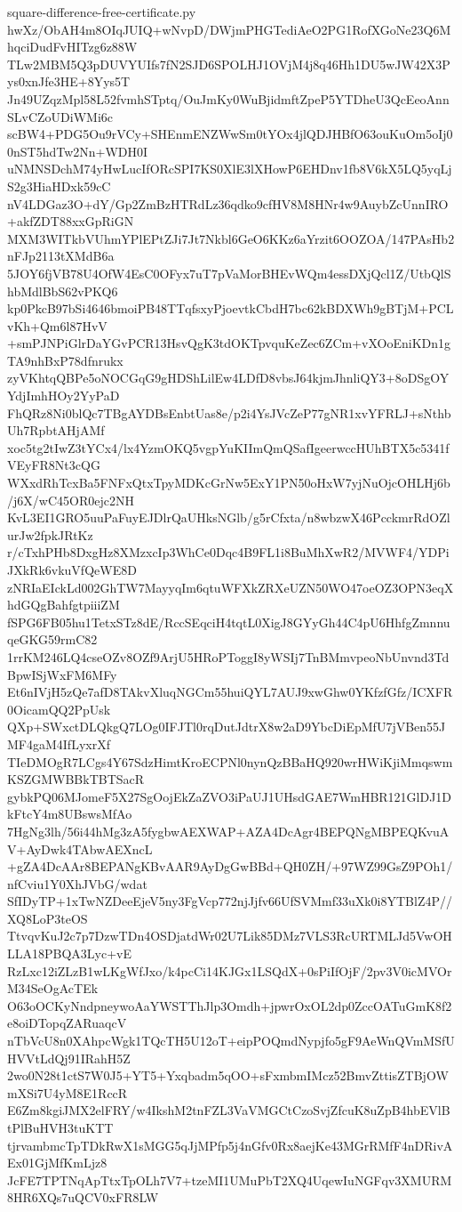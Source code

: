\documentclass[11pt]{article}
\theoremstyle{definition}
\theoremstyle{remark}
\begin{document}
\begin{filecontents*}[overwrite]{square-difference-free-certificate.py}
hwXz/ObAH4m8OIqJUIQ+wNvpD/DWjmPHGTediAeO2PG1RofXGoNe23Q6MhqciDudFvHITzg6z88W
TLw2MBM5Q3pDUVYUIfs7fN2SJD6SPOLHJ1OVjM4j8q46Hh1DU5wJW42X3Pys0xnJfe3HE+8Yys5T
Jn49UZqzMpl58L52fvmhSTptq/OuJmKy0WuBjidmftZpeP5YTDheU3QcEeoAnnSLvCZoUDiWMi6c
scBW4+PDG5Ou9rVCy+SHEnmENZWwSm0tYOx4jlQDJHBfO63ouKuOm5oIj00nST5hdTw2Nn+WDH0I
uNMNSDchM74yHwLucIfORcSPI7KS0XlE3lXHowP6EHDnv1fb8V6kX5LQ5yqLjS2g3HiaHDxk59cC
nV4LDGaz3O+dY/Gp2ZmBzHTRdLz36qdko9cfHV8M8HNr4w9AuybZcUnnIRO+akfZDT88xxGpRiGN
MXM3WITkbVUhmYPlEPtZJi7Jt7Nkbl6GeO6KKz6aYrzit6OOZOA/147PAsHb2nFJp2113tXMdB6a
5JOY6fjVB78U4OfW4EsC0OFyx7uT7pVaMorBHEvWQm4essDXjQcl1Z/UtbQlShbMdlBbS62vPKQ6
kp0PkcB97bSi4646bmoiPB48TTqfsxyPjoevtkCbdH7bc62kBDXWh9gBTjM+PCLvKh+Qm6l87HvV
+smPJNPiGlrDaYGvPCR13HsvQgK3tdOKTpvquKeZec6ZCm+vXOoEniKDn1gTA9nhBxP78dfnrukx
zyVKhtqQBPe5oNOCGqG9gHDShLilEw4LDfD8vbsJ64kjmJhnliQY3+8oDSgOYYdjImhHOy2YyPaD
FhQRz8Ni0blQc7TBgAYDBsEnbtUas8e/p2i4YsJVcZeP77gNR1xvYFRLJ+sNthbUh7RpbtAHjAMf
xoc5tg2tIwZ3tYCx4/lx4YzmOKQ5vgpYuKIImQmQSafIgeerwccHUhBTX5c5341fVEyFR8Nt3cQG
WXxdRhTcxBa5FNFxQtxTpyMDKcGrNw5ExY1PN50oHxW7yjNuOjcOHLHj6b/j6X/wC45OR0ejc2NH
KvL3EI1GRO5uuPaFuyEJDlrQaUHksNGlb/g5rCfxta/n8wbzwX46PcckmrRdOZlurJw2fpkJRtKz
r/cTxhPHb8DxgHz8XMzxcIp3WhCe0Dqc4B9FL1i8BuMhXwR2/MVWF4/YDPiJXkRk6vkuVfQeWE8D
zNRIaEIckLd002GhTW7MayyqIm6qtuWFXkZRXeUZN50WO47oeOZ3OPN3eqXhdGQgBahfgtpiiiZM
fSPG6FB05hu1TetxSTz8dE/RccSEqciH4tqtL0XigJ8GYyGh44C4pU6HhfgZmnnuqeGKG59rmC82
1rrKM246LQ4cseOZv8OZf9ArjU5HRoPToggI8yWSIj7TnBMmvpeoNbUnvnd3TdBpwISjWxFM6MFy
Et6nIVjH5zQe7afD8TAkvXluqNGCm55huiQYL7AUJ9xwGhw0YKfzfGfz/ICXFR0OicamQQ2PpUsk
QXp+SWxctDLQkgQ7LOg0IFJTl0rqDutJdtrX8w2aD9YbcDiEpMfU7jVBen55JMF4gaM4IfLyxrXf
TIeDMOgR7LCgs4Y67SdzHimtKroECPNl0nynQzBBaHQ920wrHWiKjiMmqswmKSZGMWBBkTBTSacR
gybkPQ06MJomeF5X27SgOojEkZaZVO3iPaUJ1UHsdGAE7WmHBR121GlDJ1DkFtcY4m8UBswsMfAo
7HgNg3lh/56i44hMg3zA5fygbwAEXWAP+AZA4DcAgr4BEPQNgMBPEQKvuAV+AyDwk4TAbwAEXncL
+gZA4DcAAr8BEPANgKBvAAR9AyDgGwBBd+QH0ZH/+97WZ99GsZ9POh1/nfCviu1Y0XhJVbG/wdat
SfIDyTP+1xTwNZDeeEjeV5ny3FgVcp772njJjfv66UfSVMmf33uXk0i8YTBlZ4P//XQ8LoP3teOS
TtvqvKuJ2c7p7DzwTDn4OSDjatdWr02U7Lik85DMz7VLS3RcURTMLJd5VwOHLLA18PBQA3Lyc+vE
RzLxc12iZLzB1wLKgWfJxo/k4pcCi14KJGx1LSQdX+0sPiIfOjF/2pv3V0icMVOrM34SeOgAcTEk
O63oOCKyNndpneywoAaYWSTThJlp3Omdh+jpwrOxOL2dp0ZccOATuGmK8f2e8oiDTopqZARuaqcV
nTbVcU8n0XAhpcWgk1TQcTH5U12oT+eipPOQmdNypjfo5gF9AeWnQVmMSfUHVVtLdQj91IRahH5Z
2wo0N28t1ctS7W0J5+YT5+Yxqbadm5qOO+sFxmbmIMcz52BmvZttisZTBjOWmXSi7U4yM8E1RccR
E6Zm8kgiJMX2elFRY/w4IkshM2tnFZL3VaVMGCtCzoSvjZfcuK8uZpB4hbEVlBtPlBuHVH3tuKTT
tjrvambmcTpTDkRwX1sMGG5qJjMPfp5j4nGfv0Rx8aejKe43MGrRMfF4nDRivAEx01GjMfKmLjz8
JcFE7TPTNqApTtxTpOLh7V7+tzeMI1UMuPbT2XQ4UqewIuNGFqv3XMURM8HR6XQs7uQCV0xFR8LW

\end{filecontents*}
\end{document}
